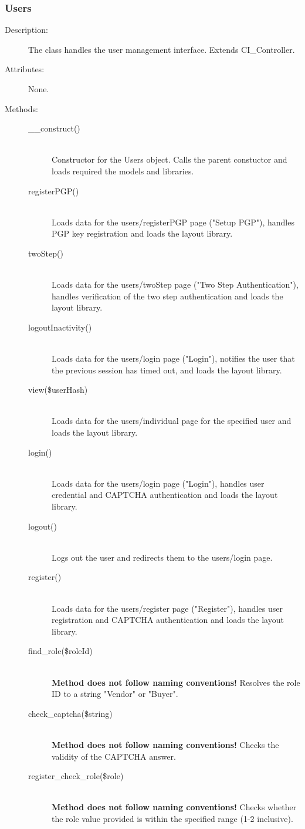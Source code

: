 \documentclass[11pt]{article} %
\begin{document}
\subsubsection{Users}
\begin{description}
\item[Description:] The class handles the user management interface. Extends CI\_Controller.
\item[Attributes:] None.
\item[Methods:] \textbf{ }
\begin{description}
\item[\_\_construct()]  \textbf{ }\\
Constructor for the Users object. Calls the parent constuctor and loads required the models and libraries.
\item[registerPGP()]  \textbf{ }\\
Loads data for the users/registerPGP page ("Setup PGP"), handles PGP key registration and loads the layout library.
\item[twoStep()]  \textbf{ }\\
Loads data for the users/twoStep page ("Two Step Authentication"), handles verification of the two step authentication and loads the layout library.
\item[logoutInactivity()]  \textbf{ }\\
Loads data for the users/login page ("Login"), notifies the user that the previous session has timed out, and loads the layout library.
\item[view(\$userHash)]  \textbf{ }\\
Loads data for the users/individual page for the specified user and loads the layout library.
\item[login()]  \textbf{ }\\
Loads data for the users/login page ("Login"), handles user credential and CAPTCHA authentication and loads the layout library.
\item[logout()]  \textbf{ }\\
Logs out the user and redirects them to the users/login page.
\item[register()]  \textbf{ }\\
Loads data for the users/register page ("Register"), handles user registration and CAPTCHA authentication and loads the layout library.
\item[find\_role(\$roleId)]  \textbf{ }\\
\textbf{Method does not follow naming conventions!} Resolves the role ID to a string "Vendor" or "Buyer".
\item[check\_captcha(\$string)]  \textbf{ }\\
\textbf{Method does not follow naming conventions!} Checks the validity of the CAPTCHA answer.
\item[register\_check\_role(\$role)]  \textbf{ }\\
\textbf{Method does not follow naming conventions!} Checks whether the role value provided is within the specified range (1-2 inclusive).
\end{description} 
\end{description} 
\end{document}

